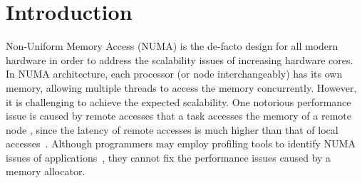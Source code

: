 
\section{Introduction}
\label{sec:intro}

Non-Uniform Memory Access (NUMA) is the de-facto design for all modern hardware in order to address the scalability issues of increasing hardware cores. 
In NUMA architecture, each processor (or node interchangeably) has its own memory, allowing multiple threads to access the memory concurrently. However, it is challenging to achieve the expected scalability. One notorious performance issue is caused by remote accesses that a task accesses the memory of a remote node ,  since the latency of remote accesses is much higher than that of local accesses~\cite{Blagodurov:2011:CNC:2002181.2002182}. 
Although programmers may employ profiling tools to identify NUMA issues of applications~\cite{Intel:VTune, Memphis, Lachaize:2012:MMP:2342821.2342826, XuNuma, NumaMMA, 7847070, NumaPerf}, they cannot fix the performance issues caused by a memory allocator.

